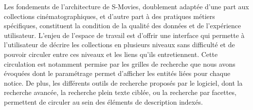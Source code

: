 Les fondements de l'architecture de S-Movies, doublement adaptée d’une part aux collections cinématographiques, et d’autre part à des pratiques métiers spécifiques, constituent la condition de la qualité des données et de l’expérience utilisateur. L'enjeu de l'espace de travail est d'offrir une interface qui permette à l'utilisateur de décrire les collections en plusieurs niveaux sans difficulté et de pouvoir circuler entre ces niveaux et les liens qu’ils entretiennent. Cette circulation est notamment permise par les grilles de recherche que nous avons évoquées dont le paramétrage permet d’afficher les entités liées pour chaque notice. De plus, les différents outils de recherche proposés par le logiciel, dont la recherche avancée, la recherche plein texte ciblée, ou la recherche par facettes, permettent de circuler au sein des éléments de description indexés. 

